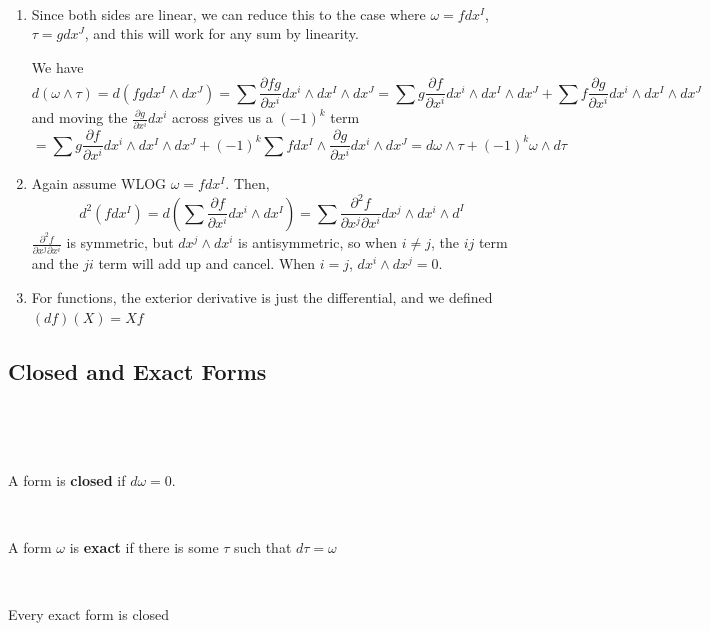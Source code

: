 \documentclass{article}
\begin{document}
\begin{customproof}
  \

  \begin{enumerate}
    \item Since both sides are linear, we can reduce this to the case where $\omega = fdx^I$, $\tau = gdx^J$, and this will work for any sum by linearity.

      We have $$d(\omega \wedge \tau) = d(fg dx^I \wedge dx^J) = \sum \frac{\partial fg}{\partial x^i} dx^i \wedge dx^I \wedge dx^J = \sum g\frac{\partial f}{\partial x^i} dx^i \wedge dx^I \wedge dx^J + \sum f\frac{\partial g}{\partial x^i} dx^i \wedge dx^I \wedge dx^J$$and moving the $\frac{\partial g}{\partial x^i} dx^i$ across gives us a $(-1)^k$ term$$= \sum g\frac{\partial f}{\partial x^i} dx^i \wedge dx^I \wedge dx^J + (-1)^k \sum f dx^I \wedge \frac{\partial g}{\partial x^i} dx^i \wedge dx^J = d\omega \wedge \tau + (-1)^k \omega \wedge d\tau$$
    \item Again assume WLOG $\omega = fdx^I$. Then, $$d^2(fdx^I) = d(\sum \frac{\partial f}{\partial x^i} dx^i \wedge dx^I) = \sum \frac{\partial^2 f}{\partial x^j \partial x^i} dx^j \wedge dx^i \wedge d^I$$$\frac{\partial^2 f}{\partial x^j \partial x^i}$ is symmetric, but $dx^j \wedge dx^i$ is antisymmetric, so when $i \neq j$, the $ij$ term and the $ji$ term will add up and cancel. When $i = j$, $dx^i \wedge dx^j = 0$.
    \item For functions, the exterior derivative is just the differential, and we defined $(df)(X) = Xf$
  \end{enumerate}
\end{customproof}

\subsection{Closed and Exact Forms}
\

\begin{definition}
  \

  A form is \textbf{closed} if $d\omega= 0$.
\end{definition}

\begin{definition}
  \

  A form $\omega$ is \textbf{exact} if there is some $\tau$ such that $d\tau = \omega$
\end{definition}

\begin{proposition}
  \

  Every exact form is closed
\end{proposition}
\end{document}
